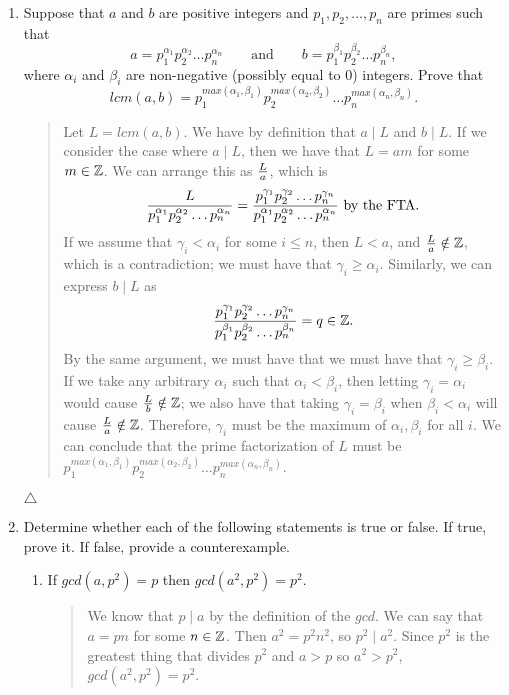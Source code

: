 \documentclass{hw}
\begin{document}
\begin{enumerate}
\item Suppose that $a$ and $b$ are positive integers and $p_1, p_2,\dots, p_n$ are primes such that
\[
a = p_{1}^{\alpha_1}p_{2}^{\alpha_2}\dots p_{n}^{\alpha_n}
\qquad\text{and}\qquad
b = p_{1}^{\beta_1}p_{2}^{\beta_2}\dots p_{n}^{\beta_n},
\]
where $\alpha_{i}$ and $\beta_{i}$ are non-negative (possibly equal to 0) integers. Prove that
\[
lcm(a,b)=p_{1}^{max(\alpha_{1},\beta_{1})}p_{2}^{max(\alpha_{2},\beta_{2})}\dots
p_{n}^{max(\alpha_{n},\beta_{n})}.
\]
\begin{quote}
Let $L = lcm(a,b)$. We have by definition that $a\mid L$ and $b\mid L$. If we consider the case where
$a\mid L$, then we have that $L = am$ for some $m\in\mathbb{Z}$. We can arrange this as ${L\over a}$, which is
\[
{L\over p_{1}^{\alpha_1}p_{2}^{\alpha_2}\dots p_{n}^{\alpha_n}}
=
{
p_{1}^{\gamma_1}p_{2}^{\gamma_2}\dots p_{n}^{\gamma_n}
\over
p_{1}^{\alpha_1}p_{2}^{\alpha_2}\dots p_{n}^{\alpha_n}
}
\text{ by the FTA.}
\]
If we assume that $\gamma_{i} < \alpha_{i}$ for some $i\leq n$, then $L < a$, and ${L\over a}\notin\mathbb{Z}$,
which is a contradiction; we must have that $\gamma_{i} \geq \alpha_{i}$. Similarly, we can express
$b\mid L$ as
\[
{
p_{1}^{\gamma_1}p_{2}^{\gamma_2}\dots p_{n}^{\gamma_n}
\over
p_{1}^{\beta_1}p_{2}^{\beta_2}\dots p_{n}^{\beta_n}
}
= q\in\mathbb{Z}.
\]
By the same argument, we must have that we must have that $\gamma_{i} \geq \beta_{i}$. If we take
any arbitrary $\alpha_{i}$ such that $\alpha_{i} < \beta_{i}$, then letting
$\gamma_{i} = \alpha_{i}$ would cause ${L\over b}\notin\mathbb{Z}$; we also have that taking
$\gamma_{i} = \beta_{i}$ when $\beta_{i} < \alpha_{i}$ will cause ${L\over a}\notin\mathbb{Z}$. Therefore,
$\gamma_{i}$ must be the maximum of $\alpha_{i},\beta_{i}$ for all $i$. We can conclude that
the prime factorization of $L$ must be
$p_{1}^{max(\alpha_{1},\beta_{1})}p_{2}^{max(\alpha_{2},\beta_{2})}\dots
p_{n}^{max(\alpha_{n},\beta_{n})}$.
\end{quote}
$\triangle$



\item Determine whether each of the following statements is true or false. If true, prove it. If false,
provide a counterexample.
\begin{enumerate}
\item If $gcd(a, p^2) = p$ then $gcd(a^2, p^2) = p^2$.
\begin{quote}
We know that $p\mid a$ by the definition of the $gcd$. We can say that $a = pn$ for some $n\in\mathbb{Z}$.
Then $a^2=p^2n^2$, so $p^2\mid a^2$. Since $p^2$ is the greatest thing that divides $p^2$ and
$a > p$ so $a^2>p^2$, $gcd(a^2, p^2) = p^2$.
\end{quote}


\end{enumerate}
\end{enumerate}
\end{document}
